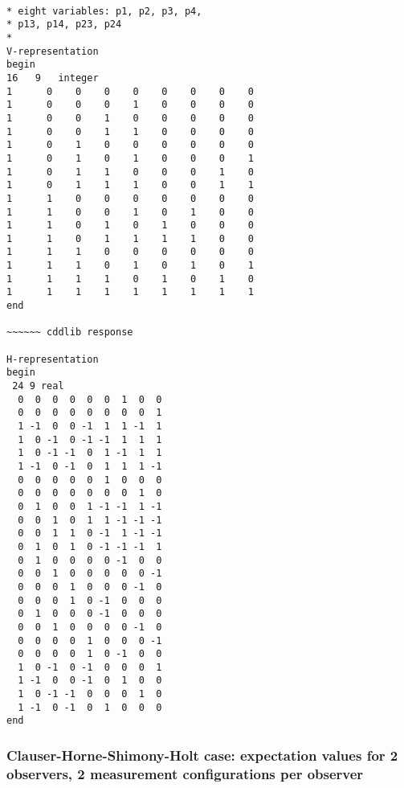 \documentclass[%
  twocolumn,
 showpacs,
 showkeys,
 preprintnumbers,
 amsmath,amssymb,
 aps,
  pra,
  longbibliography,
 floatfix,
 ]{revtex4-1}
\begin{document}
{ \begin{lstlisting}[backgroundcolor=\color{yellow!10},framerule=0pt,breaklines=true, frame=tb]

* eight variables: p1, p2, p3, p4,
* p13, p14, p23, p24
*
V-representation
begin
16   9   integer
1      0    0    0    0    0    0    0    0
1      0    0    0    1    0    0    0    0
1      0    0    1    0    0    0    0    0
1      0    0    1    1    0    0    0    0
1      0    1    0    0    0    0    0    0
1      0    1    0    1    0    0    0    1
1      0    1    1    0    0    0    1    0
1      0    1    1    1    0    0    1    1
1      1    0    0    0    0    0    0    0
1      1    0    0    1    0    1    0    0
1      1    0    1    0    1    0    0    0
1      1    0    1    1    1    1    0    0
1      1    1    0    0    0    0    0    0
1      1    1    0    1    0    1    0    1
1      1    1    1    0    1    0    1    0
1      1    1    1    1    1    1    1    1
end

~~~~~~ cddlib response

H-representation
begin
 24 9 real
  0  0  0  0  0  0  1  0  0
  0  0  0  0  0  0  0  0  1
  1 -1  0  0 -1  1  1 -1  1
  1  0 -1  0 -1 -1  1  1  1
  1  0 -1 -1  0  1 -1  1  1
  1 -1  0 -1  0  1  1  1 -1
  0  0  0  0  0  1  0  0  0
  0  0  0  0  0  0  0  1  0
  0  1  0  0  1 -1 -1  1 -1
  0  0  1  0  1  1 -1 -1 -1
  0  0  1  1  0 -1  1 -1 -1
  0  1  0  1  0 -1 -1 -1  1
  0  1  0  0  0  0 -1  0  0
  0  0  1  0  0  0  0  0 -1
  0  0  0  1  0  0  0 -1  0
  0  0  0  1  0 -1  0  0  0
  0  1  0  0  0 -1  0  0  0
  0  0  1  0  0  0  0 -1  0
  0  0  0  0  1  0  0  0 -1
  0  0  0  0  1  0 -1  0  0
  1  0 -1  0 -1  0  0  0  1
  1 -1  0  0 -1  0  1  0  0
  1  0 -1 -1  0  0  0  1  0
  1 -1  0 -1  0  1  0  0  0
end

\end{lstlisting}  }


\subsubsection{Clauser-Horne-Shimony-Holt case: expectation values for 2 observers, 2 measurement configurations per observer}
\label{2017-b-chshcevta}
\end{document}
